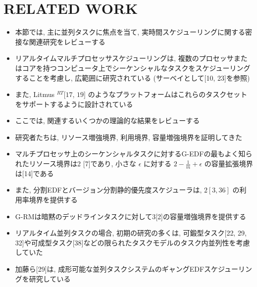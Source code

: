 
\section{RELATED WORK}
\label{sec: Related Work}

\begin{frame}{}
    \begin{itemize}
        \item 本節では, 主に並列タスクに焦点を当て, 実時間スケジューリングに関する密接な関連研究をレビューする
    \end{itemize}
\end{frame}

\begin{frame}{}
    \begin{itemize}
        \item リアルタイムマルチプロセッサスケジューリングは, 複数のプロセッサまたはコアを持つコンピュータ上でシーケンシャルなタスクをスケジューリングすることを考慮し, 広範囲に研究されている (サーベイとして[10, 23]を参照) 
\item また, Litmus $^{R T}[17$, $19]$ のようなプラットフォームはこれらのタスクセットをサポートするように設計されている
    \end{itemize}
\end{frame}

\begin{frame}{}
    \begin{itemize}
        \item ここでは, 関連するいくつかの理論的な結果をレビューする
\item 研究者たちは, リソース増強境界, 利用境界, 容量増強境界を証明してきた
\item マルチプロセッサ上のシーケンシャルタスクに対するG-EDFの最もよく知られたリソース境界は2 [7]であり, 小さな $\epsilon$ に対する $2-\frac{1}{m}+\epsilon$ の容量拡張境界は[14]である
\item また, 分割EDFとバージョン分割静的優先度スケジューラは, $2[3,36]$ の利用率境界を提供する
\item G-RMは暗黙のデッドラインタスクに対して3[2]の容量増強境界を提供する
    \end{itemize}
\end{frame}

\begin{frame}{}
    \begin{itemize}
        \item リアルタイム並列タスクの場合, 初期の研究の多くは, 可鍛型タスク[22, 29, 32]や可成型タスク[38]などの限られたタスクモデルのタスク内並列性を考慮していた
\item 加藤ら[29]は, 成形可能な並列タスクシステムのギャングEDFスケジューリングを研究している
    \end{itemize}
\end{frame}

